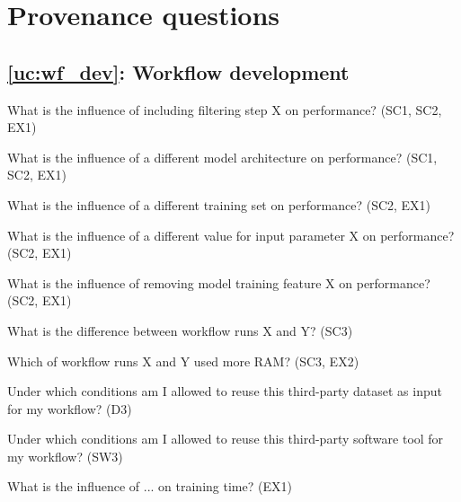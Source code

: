 \section{Provenance questions}\label{sup:provquestions}




\subsection*{\ref{uc:wf_dev}: Workflow development}

\begin{provquestions}
    \item What is the influence of including filtering step X on performance? (SC1, SC2, EX1)
    \item What is the influence of a different model architecture on performance? (SC1, SC2, EX1)
    \item What is the influence of a different training set on performance? (SC2, EX1)
    \item What is the influence of a different value for input parameter X on performance? (SC2, EX1)
    \item What is the influence of removing model training feature X on performance? (SC2, EX1)
    \item What is the difference between workflow runs X and Y? (SC3)
    \item Which of workflow runs X and Y used more RAM? (SC3, EX2)
    \item Under which conditions am I allowed to reuse this third-party dataset as input for my workflow? (D3)
    \item Under which conditions am I allowed to reuse this third-party software tool for my workflow? (SW3)
    \item What is the influence of ... on training time? (EX1)
\end{provquestions}

